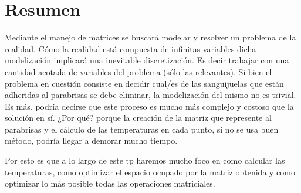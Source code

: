 \section{Resumen}

Mediante el manejo de matrices se buscará modelar y resolver un problema de la realidad. Cómo la realidad está compuesta de infinitas variables dicha modelización implicará una inevitable discretización. Es decir trabajar con una 
cantidad acotada de variables del problema (sólo las relevantes).
Si bien el problema en cuestión consiste en decidir cual/es de las sanguijuelas que están adheridas al parabrisas se debe eliminar, la modelización del mismo no es trivial. 
Es más, podría decirse que este proceso es mucho más complejo y costoso que la solución en sí. ¿Por qué? porque la creación de la matriz que represente al parabrisas y el cálculo de las temperaturas en cada punto, si no se 
usa buen método, podría llegar a demorar mucho tiempo.

Por esto es que a lo largo de este tp haremos mucho foco en como calcular las temperaturas, como optimizar el espacio ocupado por la matriz obtenida y como optimizar lo más posible todas las operaciones matriciales.


